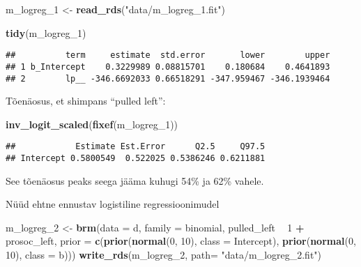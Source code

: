 \documentclass[]{article}
\newenvironment{Shaded}{\begin{snugshade}}{\end{snugshade}}
\newcommand{\KeywordTok}[1]{\textcolor[rgb]{0.13,0.29,0.53}{\textbf{#1}}}
\newcommand{\DataTypeTok}[1]{\textcolor[rgb]{0.13,0.29,0.53}{#1}}
\newcommand{\DecValTok}[1]{\textcolor[rgb]{0.00,0.00,0.81}{#1}}
\newcommand{\StringTok}[1]{\textcolor[rgb]{0.31,0.60,0.02}{#1}}
\newcommand{\OperatorTok}[1]{\textcolor[rgb]{0.81,0.36,0.00}{\textbf{#1}}}
\newcommand{\NormalTok}[1]{#1}
\begin{document}
\begin{Shaded}
\begin{Highlighting}[]
\NormalTok{m_logreg_}\DecValTok{1}\NormalTok{ <-}\StringTok{ }\KeywordTok{read_rds}\NormalTok{(}\StringTok{"data/m_logreg_1.fit"}\NormalTok{)}
\end{Highlighting}
\end{Shaded}

\begin{Shaded}
\begin{Highlighting}[]
\KeywordTok{tidy}\NormalTok{(m_logreg_}\DecValTok{1}\NormalTok{)}
\end{Highlighting}
\end{Shaded}

\begin{verbatim}
##          term     estimate  std.error       lower        upper
## 1 b_Intercept    0.3229989 0.08815701    0.180684    0.4641893
## 2        lp__ -346.6692033 0.66518291 -347.959467 -346.1939464
\end{verbatim}

Tõenäosus, et shimpans ``pulled left'':

\begin{Shaded}
\begin{Highlighting}[]
\KeywordTok{inv_logit_scaled}\NormalTok{(}\KeywordTok{fixef}\NormalTok{(m_logreg_}\DecValTok{1}\NormalTok{))}
\end{Highlighting}
\end{Shaded}

\begin{verbatim}
##            Estimate Est.Error      Q2.5     Q97.5
## Intercept 0.5800549  0.522025 0.5386246 0.6211881
\end{verbatim}

See tõenäosus peaks seega jääma kuhugi 54\% ja 62\% vahele.

Nüüd ehtne ennustav logistiline regressioonimudel

\begin{Shaded}
\begin{Highlighting}[]
\NormalTok{m_logreg_}\DecValTok{2}\NormalTok{ <-}
\StringTok{  }\KeywordTok{brm}\NormalTok{(}\DataTypeTok{data =}\NormalTok{ d, }\DataTypeTok{family =}\NormalTok{ binomial,}
\NormalTok{      pulled_left }\OperatorTok{~}\StringTok{ }\DecValTok{1} \OperatorTok{+}\StringTok{ }\NormalTok{prosoc_left,}
      \DataTypeTok{prior =} \KeywordTok{c}\NormalTok{(}\KeywordTok{prior}\NormalTok{(}\KeywordTok{normal}\NormalTok{(}\DecValTok{0}\NormalTok{, }\DecValTok{10}\NormalTok{), }\DataTypeTok{class =}\NormalTok{ Intercept),}
                \KeywordTok{prior}\NormalTok{(}\KeywordTok{normal}\NormalTok{(}\DecValTok{0}\NormalTok{, }\DecValTok{10}\NormalTok{), }\DataTypeTok{class =}\NormalTok{ b)))}
\KeywordTok{write_rds}\NormalTok{(m_logreg_}\DecValTok{2}\NormalTok{, }\DataTypeTok{path=} \StringTok{"data/m_logreg_2.fit"}\NormalTok{)}
\end{Highlighting}
\end{Shaded}
\end{document}
